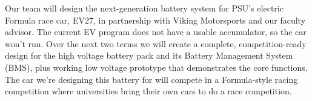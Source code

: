 Our team will design the next-generation battery system for PSU’s electric Formula race car, EV27, in partnership with Viking Motorsports and our faculty advisor. The current EV program does not have a usable accumulator, so the car won’t run. Over the next two terms we will create a complete, competition-ready design for the high voltage battery pack and its Battery Management System (BMS), plus working low voltage prototype that demonstrates the core functions. The car we’re designing this battery for will compete in a Formula-style racing competition where universities bring their own cars to do a race competition.